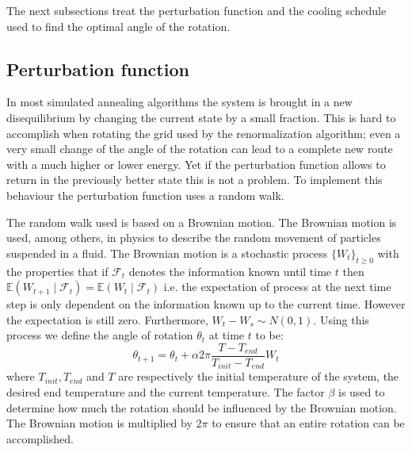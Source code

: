 The next subsections treat the perturbation function and the cooling schedule used
to find the optimal angle of the rotation.

\subsection{Perturbation function}
In most simulated annealing algorithms the system is brought in a new
disequilibrium by changing the current state by a small fraction. This is hard
to accomplish when rotating the grid used by the renormalization algorithm;
even a very small change of the angle of the rotation can lead to a complete
new route with a much higher or lower energy. Yet if the perturbation function
allows to return in the previously better state this is not a problem. To
implement this behaviour the perturbation function uses a random walk.

\newcommand{\expt}{\ensuremath{\mathbb{E}}}
The random walk used is based on a Brownian motion\cite{brown1829bam}. The
Brownian motion is used, among others, in physics to describe the random
movement of particles suspended in a fluid. The Brownian motion is
a stochastic process $\lbrace W_t\rbrace_{t\geq 0}$ with the properties that
if $\mathcal{F}_t$ denotes the information known until time $t$ then 
$\expt(W_{t + 1}\mid \mathcal{F}_t) = \expt(W_t \mid \mathcal{F}_t)$ i.e. the
expectation of process at the next time step is only dependent on the
information known up to the current time. However the expectation is still
zero. Furthermore, $W_t - W_s \sim N(0, 1)$. Using this process we define the
angle of rotation $\theta_t$ at time $t$ to be:
\begin{equation}\label{eq:rot}
\theta_{t + 1} = \theta_{t} + \alpha 2\pi\frac{T - T_{end}}
	{T_{init} - T_{end}}W_t
\end{equation}
where $T_{init}, T_{end}$ and $T$ are respectively the initial temperature of
the system, the desired end temperature and the current temperature. The
factor $\beta$ is used to determine how much the rotation should be influenced
by the Brownian motion. The Brownian motion is multiplied by $2\pi$ to ensure
that an entire rotation can be accomplished.

